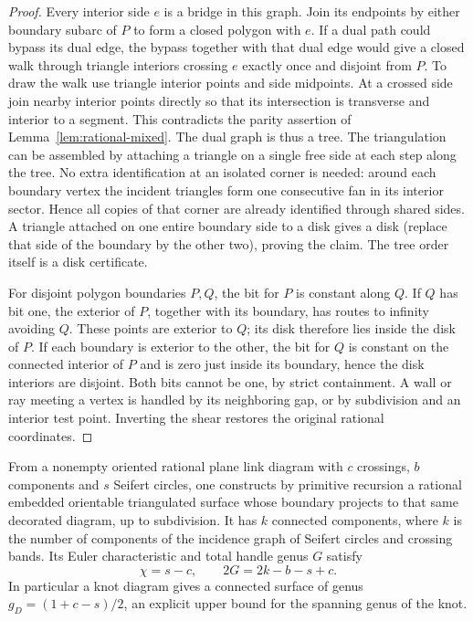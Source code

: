 \begin{proof}
Every interior side $e$ is a bridge in this graph. Join its endpoints
by either boundary subarc of $P$ to form a closed polygon with $e$.
If a dual path could bypass its dual edge, the bypass together with
that dual edge would give a closed walk through triangle interiors
crossing $e$ exactly once and disjoint from $P$. To draw the walk use
triangle interior points and side midpoints. At a crossed side join
nearby interior points directly so that its intersection is transverse
and interior to a segment. This contradicts the parity assertion of
Lemma~\ref{lem:rational-mixed}. The dual graph is thus a tree.
The triangulation can be assembled by attaching a triangle on a single
free side at each step along the tree. No extra identification at an
isolated corner is needed: around each boundary vertex the incident
triangles form one consecutive fan in its interior sector. Hence all
copies of that corner are already identified through shared sides.
A triangle attached on one entire boundary side to a disk gives a disk
(replace that side of the boundary by the other two), proving the claim.
The tree order itself is a disk certificate.

For disjoint polygon boundaries $P,Q$, the bit for $P$ is constant
along $Q$. If $Q$ has bit one, the exterior of $P$, together with its
boundary, has routes to infinity avoiding $Q$. These points are exterior
to $Q$; its disk therefore lies inside the disk of $P$. If each boundary
is exterior to the other, the bit for $Q$ is constant on the connected
interior of $P$ and is zero just inside its boundary, hence the disk
interiors are disjoint. Both bits cannot be one, by strict containment.
A wall or ray meeting a vertex is handled by its neighboring gap, or by
subdivision and an interior test point. Inverting the shear restores the
original rational coordinates.
\end{proof}

\begin{theorem}
\label{thm:seifert-pl}
From a nonempty oriented rational plane link diagram with $c$ crossings,
$b$ components and $s$ Seifert circles, one constructs by primitive
recursion a rational embedded orientable triangulated surface whose
boundary projects to that same decorated diagram, up to subdivision.
It has $k$ connected components, where $k$ is the number of components
of the incidence graph of Seifert circles and crossing bands. Its Euler
characteristic and total handle genus $G$ satisfy
\[
  \chi=s-c,\qquad 2G=2k-b-s+c.
\]
In particular a knot diagram gives a connected surface of genus
$g_D=(1+c-s)/2$, an explicit upper bound for the spanning genus of the knot.
\end{theorem}

